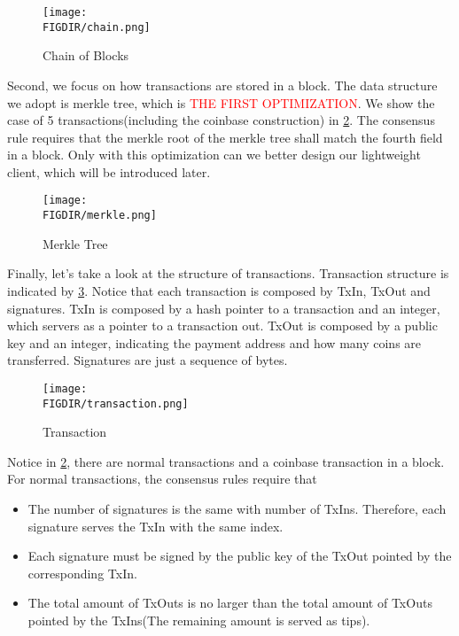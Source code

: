 \documentclass{article}
\begin{document}
\begin{spacing}{1.1}
\begin{figure}[htbp]
    \centering
    \texttt{[image: \\FIGDIR/chain.png]}
    \caption{Chain of Blocks}
    \label{fig:chain}
\end{figure}

Second, we focus on how transactions are stored in a block. The data structure we adopt is merkle tree, which is \textcolor{red}{THE FIRST OPTIMIZATION}. We show the case of 5 transactions(including the coinbase construction) in \cref{fig:merkle}. The consensus rule requires that the merkle root of the merkle tree shall match the fourth field in a block. Only with this optimization can we better design our lightweight client, which will be introduced later.

\begin{figure}[htbp]
    \centering
    \texttt{[image: \\FIGDIR/merkle.png]}
    \caption{Merkle Tree}
    \label{fig:merkle}
\end{figure}

Finally, let's take a look at the structure of transactions. Transaction structure is indicated by \cref{fig:transaction}. Notice that each transaction is composed by TxIn, TxOut and signatures. TxIn is composed by a hash pointer to a transaction and an integer, which servers as a pointer to a transaction out. TxOut is composed by a public key and an integer, indicating the payment address and how many coins are transferred. Signatures are just a sequence of bytes.
\begin{figure}[htbp]
    \centering
    \texttt{[image: \\FIGDIR/transaction.png]}
    \caption{Transaction}
    \label{fig:transaction}
\end{figure}

Notice in \cref{fig:merkle}, there are normal transactions and a coinbase transaction in a block. For normal transactions, the consensus rules require that 
\begin{itemize}
    \setlength\itemsep{1pt}
    \item The number of signatures is the same with number of TxIns. Therefore, each signature serves the TxIn with the same index.
    \item Each signature must be signed by the public key of the TxOut pointed by the corresponding TxIn.
    \item The total amount of TxOuts is no larger than the total amount of TxOuts pointed by the TxIns(The remaining amount is served as tips).
\end{itemize}


\end{spacing}
\end{document}
